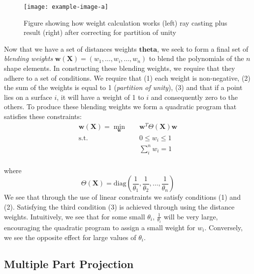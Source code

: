 \begin{figure}
    \texttt{[image: example-image-a]}
    \caption{Figure showing how weight calculation works (left) ray casting plus result (right) after correcting for partition of unity}
    \label{fig:weightcompute}
\end{figure}

Now that we have a set of distances weights $\mathbf{theta}$, we seek to form a final set of \textit{blending weights} $\mathbf{w}(\mathbf{X}) =  \left( w_1, \dots, w_i, \dots, w_n \right)$ to blend the polynomials of the $n$ shape elements. In constructing these blending weights, we require that they adhere to a set of conditions. We require that (1) each weight is non-negative, (2) the sum of the weights is equal to 1 (\textit{partition of unity}), (3) and that if a point lies on a surface $i$, it will have a weight of 1 to $i$ and consequently zero to the others. To produce these blending weights we form a quadratic program that satisfies these constraints:
\begin{equation}
\begin{aligned}
\mathbf{w}(\mathbf{X}) = \min_{\mathbf{w}} \quad & \mathbf{w}^T \Theta(\mathbf{X}) \mathbf{w}    \\
\textrm{s.t.} \quad & 0 \leq w_i \leq 1                     \\
                    &   \sum_i^n w_i = 1                      \\
\end{aligned}
\end{equation}

where
\begin{equation}
     \Theta(\mathbf{X}) = \text{diag}\left( \frac{1}{\theta_1},\frac{1}{\theta_2},\dots,\frac{1}{\theta_n}\right)
\end{equation}
We see that through the use of linear constraints we satisfy conditions (1) and (2). Satisfying the third condition (3) is achieved through using the distance weights. Intuitively, we see that for some small $\theta_i$, $\frac{1}{\theta_i}$ will be very large, encouraging the quadratic program to assign a small weight for $w_i$. Conversely, we see the opposite effect for large values of $\theta_i$.

\subsection{Multiple Part Projection}
